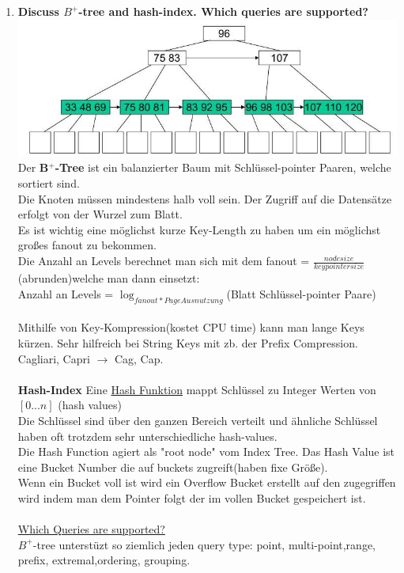 \documentclass[12pt]{article}\pagestyle{myheadings}
\theoremstyle{plain}
\begin{document}
\begin{enumerate}
\item \textbf{Discuss $B^+$-tree and hash-index. Which queries are supported?}\\
\includegraphics[scale=0.7]{BplusTree.jpg}
Der \textbf{B$^+$-Tree} ist ein balanzierter Baum mit Schlüssel-pointer Paaren, welche sortiert sind.\\
Die Knoten müssen mindestens halb voll sein.
Der Zugriff auf die Datensätze erfolgt von der Wurzel zum Blatt.\\
Es ist wichtig eine möglichst kurze Key-Length zu haben um ein möglichst großes fanout zu bekommen.\\
Die Anzahl an Levels berechnet man sich mit dem fanout = $\frac{nodesize}{keypointer size}$ (abrunden)welche man dann einsetzt:\\
Anzahl an Levels = $\log_{fanout*Page Ausnutzung}$(Blatt Schlüssel-pointer Paare)\\
\\Mithilfe von Key-Kompression(kostet CPU time) kann man lange Keys kürzen.
Sehr hilfreich bei String Keys mit zb. der Prefix Compression.\\Cagliari, Capri $\rightarrow$ Cag, Cap.\\ \\
\textbf{Hash-Index} Eine \underline{Hash Funktion} mappt Schlüssel zu Integer Werten von $[0...n]$ (hash values)\\
Die Schlüssel sind über den ganzen Bereich verteilt und ähnliche Schlüssel haben oft trotzdem sehr unterschiedliche hash-values.\\
Die Hash Function agiert als "root node" vom Index Tree. Das Hash Value ist eine Bucket Number die auf buckets zugreift(haben fixe Größe).\\ Wenn ein Bucket voll ist wird ein Overflow Bucket erstellt auf den zugegriffen wird indem man dem Pointer folgt der im vollen Bucket gespeichert ist.\\ \\
\underline{Which Queries are supported?}\\
$B^+$-tree unterstüzt so ziemlich jeden query type: point, multi-point,range, prefix, extremal,ordering, grouping.

\end{enumerate}
\end{document}
